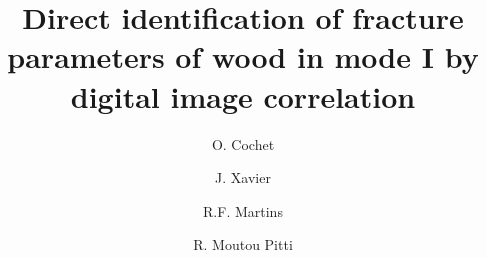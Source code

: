 \documentclass[3p,times,procedia]{elsarticle}
\begin{document}
\begin{frontmatter}



%

\title{Direct identification of fracture parameters of wood in mode I by digital image correlation}


\author[a]{O. Cochet}
\author[b]{J. Xavier}
\author[b]{R.F. Martins}
\author[a]{R. Moutou Pitti}


\address[a]{Université Clermont Auvergne, Clermont Auvergne INP, Institut Pascal, Clermont-Ferrand, France}
\address[b]{UNIDEMI, Department of Mechanical and Industrial Engineering, NOVA School of Science and Technology, NOVA University Lisbon, 2829-516 Caparica, Portugal}


\end{frontmatter}
\end{document}
